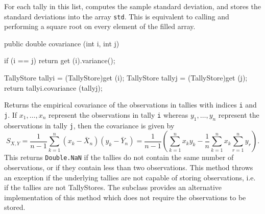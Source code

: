 \begin{tabb}   For each tally in this list, computes
 the sample standard deviation, and stores the standard deviations
 into the array \texttt{std}.
 This is equivalent to calling  and
 performing a square root on every element
 of the filled array.
\end{tabb}
\begin{htmlonly}
\end{htmlonly}
\begin{code}

   public double covariance (int i, int j)\begin{hide} {
      if (i == j)
         return get (i).variance();

      TallyStore tallyi = (TallyStore)get (i);
      TallyStore tallyj = (TallyStore)get (j);
      return tallyi.covariance (tallyj);
   }\end{hide}
\end{code}
\begin{tabb}   Returns the empirical covariance of the observations in tallies
 with indices \texttt{i} and \texttt{j}.  If $x_1,\ldots,x_n$ represent the
 observations in tally \texttt{i} whereas $y_1,\ldots,y_n$ represent the
 observations in tally \texttt{j}, then the covariance is given by
 \[ S_{X, Y} =
 \frac{1}{n-1}\sum_{k=1}^n (x_k - \bar{X}_n)(y_k - \bar{Y}_n)
 = \frac{1}{n-1}\left(\sum_{k=1}^n x_ky_k - \frac{1}{n}
  \sum_{k=1}^n x_k\sum_{r=1}^n y_r\right).\]
   This returns \texttt{Double.NaN}
   if the tallies do not contain the same number of observations, or
 if they contain less than two observations.
 This method throws an exception if the
 underlying tallies are not capable of storing
 observations, i.e. if the tallies are not TallyStores.
 The 
 subclass provides an alternative implementation
 of this method which does not require the
 observations to be stored.
\end{tabb}
\begin{htmlonly}
\end{htmlonly}
